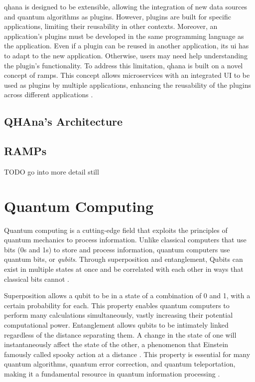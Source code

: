 \documentclass[
  a4paper,  %
  twoside,  %
  bibliography=totoc,
  headsepline,
  cleardoublepage=empty,
  parskip=half,
  draft=false
]{scrbook}
\begin{document}
\gls{qhana} is designed to be extensible, allowing the integration of new data sources and quantum algorithms as plugins.
However, plugins are built for specific applications, limiting their reusability in other contexts.
Moreover, an application's plugins must be developed in the same programming language as the application.
Even if a plugin can be reused in another application, its \gls{ui} has to adapt to the new application.
Otherwise, users may need help understanding the plugin's functionality.
To address this limitation, \gls{qhana} is built on a novel concept of \glspl{ramp}.
This concept allows microservices with an integrated UI to be used as plugins by multiple applications, enhancing the reusability of the plugins across different applications \cite{Buehler2022}.

\subsection{QHAna's Architecture}
\label{subsec:qhanaArchitecture}

\subsection{RAMPs}

TODO go into more detail still



\section{Quantum Computing}
\label{sec:quantumComputing}
Quantum computing is a cutting-edge field that exploits the principles of quantum mechanics to process information.
Unlike classical computers that use bits (0s and 1s) to store and process information, quantum computers use quantum bits, or \emph{qubits}.
Through superposition and entanglement, Qubits can exist in multiple states at once and be correlated with each other in ways that classical bits cannot \cite{Nielsen2010}.

Superposition allows a qubit to be in a state of a combination of 0 and 1, with a certain probability for each.
This property enables quantum computers to perform many calculations simultaneously, vastly increasing their potential computational power.
Entanglement allows qubits to be intimately linked regardless of the distance separating them.
A change in the state of one will instantaneously affect the state of the other, a phenomenon that Einstein famously called spooky action at a distance \cite{Einstein1935}.
This property is essential for many quantum algorithms, quantum error correction, and quantum teleportation, making it a fundamental resource in quantum information processing \cite{Nielsen2010, Preskill1998}.
\end{document}
